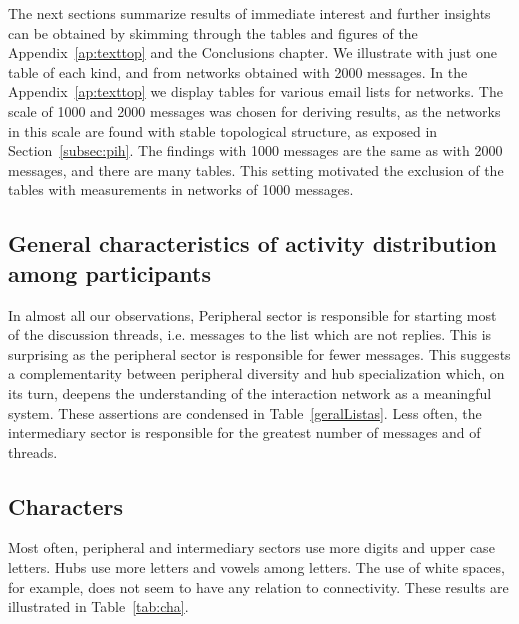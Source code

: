 The next sections summarize results of immediate interest
and further insights can be obtained by skimming through
the tables and figures of the Appendix~\ref{ap:texttop} and the Conclusions chapter.
We illustrate with just one table of each kind,
and from networks obtained with 2000 messages.
In the Appendix~\ref{ap:texttop} we display tables for various email lists
for networks.
The scale of 1000 and 2000 messages was chosen for deriving results,
as the networks in this scale are found with stable topological structure,
as exposed in Section~\ref{subsec:pih}.
The findings with 1000 messages are the same as with 2000 messages,
and there are many tables.
This setting motivated the exclusion of the tables with measurements in
networks of 1000 messages.

\subsection{General characteristics of activity distribution among participants}\label{sec:gen}

In almost all our observations,
Peripheral sector is responsible for starting most of the discussion threads,
i.e. messages to the list which are not replies.
This is surprising as the peripheral sector is responsible for fewer messages.
This suggests a complementarity between peripheral diversity and hub specialization
which, on its turn, deepens the understanding of the interaction network as a meaningful system. 
These assertions are condensed in Table~\ref{geralListas}.
Less often, the intermediary sector is responsible for the greatest number of messages
and of threads.


\subsection{Characters}\label{sec:cha}

Most often, peripheral and intermediary sectors use more digits and upper case letters.
Hubs use more letters and vowels among letters.
The use of white spaces, for example, does not seem to have any relation to connectivity. 
These results are illustrated in Table~\ref{tab:cha}.

